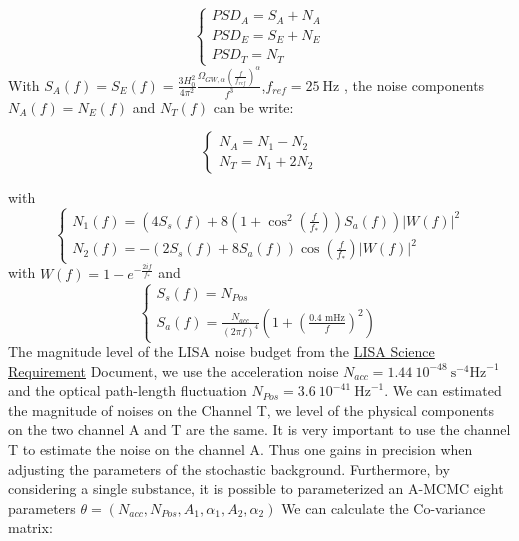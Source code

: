 \documentclass[a4paper,12pt]{article}
\begin{document}
\begin{equation}
\left\{
\begin{array}{l}
    PSD_A = S_A + N_A \\
    PSD_E = S_E + N_E \\
  PSD_T = N_T
\end{array}
\right.
\end{equation}
With $S_A(f) = S_E(f) =\frac{3H_0^2}{4 \pi^2} \frac{\Omega_{GW,\alpha}\left(\frac{f}{f_{ref}}\right)^{\alpha}}{f^3}$,$f_{ref}=25 \ \text{Hz}$ , the noise components $N_A(f)=N_E(f)$ and $N_T(f)$ can be write:

\begin{equation}
\left\{
\begin{array}{l}
    N_A = N_1 - N_2 \\
    N_T = N_1 + 2 N_2 
\end{array}
\right.
\end{equation}

with 
\begin{equation}
\left\{
\begin{array}{l}
    N_1(f) = \left(4 S_s(f) + 8\left( 1 + \cos^2\left(\frac{f}{f_*}\right)\right) S_a(f)\right)|W(f)|^2 \\
    N_2(f) = -\left(2 S_s(f) + 8 S_a(f)\right)\cos\left(\frac{f}{f_*}\right)|W(f)|^2
\end{array}
\right.
\end{equation}
with $W(f) = 1 - e^{-\frac{2if}{f_*}}$ and 
\begin{equation}
\left\{
\begin{array}{l}
    S_s(f) = N_{Pos} \\
    S_a(f) = \frac{N_{acc}}{(2 \pi f)^4}\left( 1 + \left(\frac{0.4 \text{ mHz}}{f} \right)^2 \right)
\end{array}
\right.
\end{equation}
The magnitude level of the LISA noise budget from the \href{https://atrium.in2p3.fr/nuxeo/nxdoc/default/f5a78d3e-9e19-47a5-aa11-51c81d370f5f/view_documents}{LISA Science Requirement}\cite{LSR} Document, we use the acceleration noise $N_{acc} = 1.44 \ 10^{-48} \ \text{s}^{-4}\text{Hz}^{-1}$ and the optical path-length fluctuation $N_{Pos} = 3.6 \ 10^{-41} \ \text{Hz}^{-1}$. We can estimated the magnitude of noises on the Channel T, we level of the physical components on the two channel A and T are the same. It is very important to use the channel T to estimate the noise on the channel A. Thus one gains in precision when adjusting the parameters of the stochastic background. Furthermore, by considering a single substance, it is possible to parameterized an A-MCMC eight parameters $\theta = (N_{acc},N_{Pos},A_1,\alpha_1, A_2, \alpha_2)$
We can calculate the Co-variance matrix:
\end{document}
